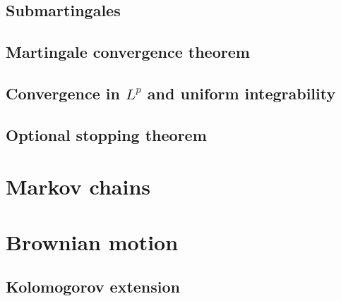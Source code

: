 \documentclass{../note}
\begin{document}
\section{Submartingales}
\section{Martingale convergence theorem}
\begin{prb}
\begin{parts}
\item
\end{parts}
\end{prb}

\begin{prb}
\begin{parts}
\item
\end{parts}
\end{prb}

\begin{prb}
\begin{parts}
\item
\end{parts}
\end{prb}

\section{Convergence in $L^p$ and uniform integrability}

\section{Optional stopping theorem}





\chapter{Markov chains}
\chapter{Brownian motion}
\section{Kolomogorov extension}
\end{document}
